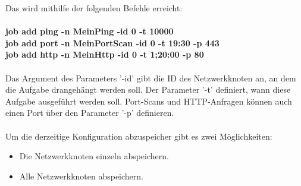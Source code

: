 \documentclass[12pt,a4paper]{report}
\begin{document}
Das wird mithilfe der folgenden Befehle erreicht:\\\\

\textbf{job add ping -n MeinPing -id 0 -t 10000}\\
\textbf{job add port -n MeinPortScan -id 0 -t 19:30 -p 443}\\
\textbf{job add http -n MeinHttp -id 0 -t 1;20:00 -p 80}\\\\

Das Argument des Parameters '-id' gibt die ID des Netzwerkknoten an, an dem die Aufgabe drangehängt werden soll. Der Parameter '-t' definiert, wann diese Aufgabe ausgeführt werden soll. Port-Scans und HTTP-Anfragen können auch einen Port über den Parameter '-p' definieren.\\\\

Um die derzeitige Konfiguration abzuspeicher gibt es zwei Möglichkeiten:

\begin{itemize}
\item Die Netzwerkknoten einzeln abspeichern.
\item Alle Netzwerkknoten abspeichern.
\end{itemize}
\end{document}
